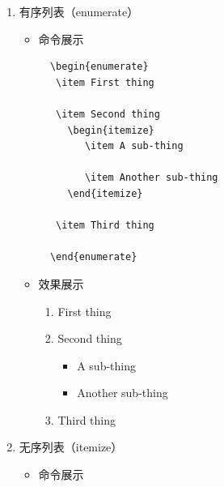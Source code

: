 \documentclass[UTF8]{ctexart}
\begin{document}
\begin{enumerate}
  \item 有序列表（enumerate）
   \begin{itemize}
      \item 命令展示
\begin{lstlisting}
  \begin{enumerate}
   \item First thing

   \item Second thing
     \begin{itemize}
        \item A sub-thing

        \item Another sub-thing
     \end{itemize}

   \item Third thing

  \end{enumerate}
\end{lstlisting}
      \item 效果展示
\begin{enumerate}
  \item First thing

  \item Second thing
    \begin{itemize}
      \item A sub-thing

      \item Another sub-thing
    \end{itemize}

  \item Third thing
\end{enumerate}
   \end{itemize}

  \item 无序列表（itemize）
     \begin{itemize}
      \item 命令展示


\end{itemize}
\end{enumerate}
\end{document}
